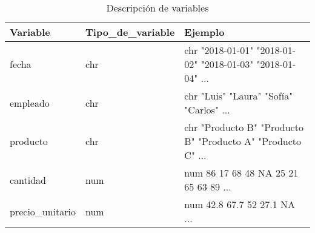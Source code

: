 \documentclass[12pt,a4paper]{article}
\begin{document}


\begin{table}[!h]

\caption{Descripción de variables}
\centering
\begin{tabular}[t]{lll}
\toprule
Variable & Tipo\_de\_variable & Ejemplo\\
\midrule
fecha & chr & chr  "2018-01-01" "2018-01-02" "2018-01-03" "2018-01-04" ...\\
empleado & chr & chr  "Luis" "Laura" "Sofía" "Carlos" ...\\
producto & chr & chr  "Producto B" "Producto B" "Producto A" "Producto C" ...\\
cantidad & num & num  86 17 68 48 NA 25 21 65 63 89 ...\\
precio\_unitario & num & num  42.8 67.7 52 27.1 NA ...\\
\bottomrule
\end{tabular}
\end{table}
\end{document}
